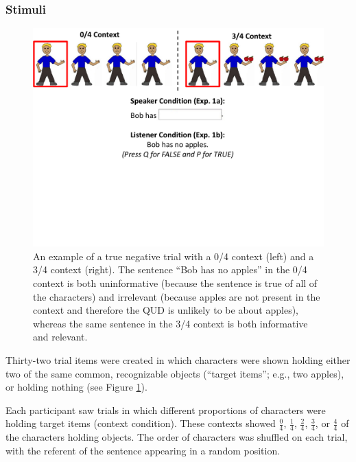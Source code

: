 \documentclass[man, floatsintext, noapacite]{apa6}
\begin{document}
\subsubsection{Stimuli}

\begin{figure}[t]
\begin{center} 
\includegraphics[width=6in]{figures/experiment1/trialfig_exp1.pdf}
\caption{\label{fig:exp1_trial} An example of a true negative trial with a 0/4 context (left) and a 3/4 context (right).  The sentence ``Bob has no apples'' in the 0/4 context is both uninformative (because the sentence is true of all of the characters) and irrelevant (because apples are not present in the context and therefore the QUD is unlikely to be about apples), whereas the same sentence in the 3/4 context is both informative and relevant. }
\vspace{-5mm}
\end{center} 
\end{figure}

Thirty-two trial items were created in which characters were shown holding either two of the same common, recognizable objects (``target items''; e.g., two apples), or holding nothing (see Figure \ref{fig:exp1_trial}). 

Each participant saw trials in which different proportions of characters were holding target items (context condition).  These contexts showed $\frac{0}{4}$, $\frac{1}{4}$, $\frac{2}{4}$, $\frac{3}{4}$, or $\frac{4}{4}$ of the characters holding objects. The order of characters was shuffled on each trial, with the referent of the sentence appearing in a random position. 
\end{document}
